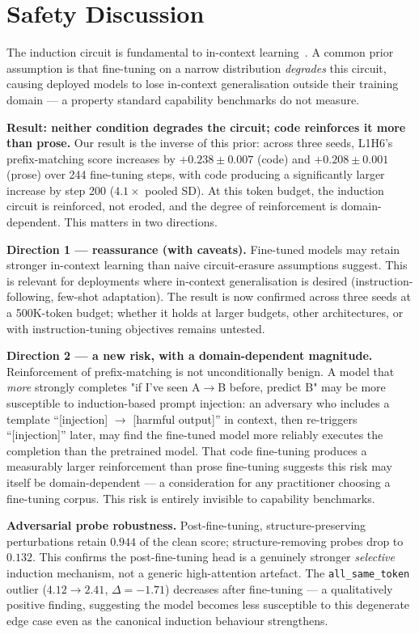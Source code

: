 \section{Safety Discussion}
\label{sec:safety}

The induction circuit is fundamental to in-context learning~\citep{olsson2022context}.
A common prior assumption is that fine-tuning on a narrow distribution
\emph{degrades} this circuit, causing deployed models to lose in-context
generalisation outside their training domain --- a property standard
capability benchmarks do not measure.

\textbf{Result: neither condition degrades the circuit; code reinforces it more than prose.}
Our result is the inverse of this prior: across three seeds, L1H6's
prefix-matching score increases by $+0.238 \pm 0.007$ (code) and
$+0.208 \pm 0.001$ (prose) over 244 fine-tuning steps, with code producing
a significantly larger increase by step 200 ($4.1\times$ pooled SD).
At this token budget, the induction circuit is reinforced, not eroded, and
the degree of reinforcement is domain-dependent. This matters in two
directions.

\textbf{Direction 1 --- reassurance (with caveats).} Fine-tuned models
may retain stronger in-context learning than naive circuit-erasure
assumptions suggest. This is relevant for deployments where in-context
generalisation is desired (instruction-following, few-shot adaptation).
The result is now confirmed across three seeds at a 500K-token budget;
whether it holds at larger budgets, other architectures, or with
instruction-tuning objectives remains untested.

\textbf{Direction 2 --- a new risk, with a domain-dependent magnitude.}
Reinforcement of prefix-matching is not unconditionally benign. A model
that \emph{more} strongly completes "if I've seen A$\to$B before, predict
B" may be more susceptible to induction-based prompt injection: an
adversary who includes a template ``[injection] $\to$ [harmful output]''
in context, then re-triggers ``[injection]'' later, may find the
fine-tuned model more reliably executes the completion than the pretrained
model. That code fine-tuning produces a measurably larger reinforcement
than prose fine-tuning suggests this risk may itself be domain-dependent
--- a consideration for any practitioner choosing a fine-tuning corpus.
This risk is entirely invisible to capability benchmarks.

\textbf{Adversarial probe robustness.} Post-fine-tuning, structure-preserving
perturbations retain $0.944$ of the clean score; structure-removing probes
drop to $0.132$. This confirms the post-fine-tuning head is a genuinely
stronger \emph{selective} induction mechanism, not a generic high-attention
artefact. The \texttt{all\_same\_token} outlier ($4.12 \to 2.41$,
$\Delta = -1.71$) decreases after fine-tuning --- a qualitatively positive
finding, suggesting the model becomes less susceptible to this degenerate
edge case even as the canonical induction behaviour strengthens.

